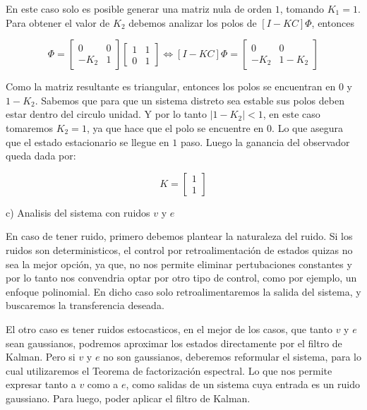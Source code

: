 En este caso solo es posible generar una matriz nula de orden $1$, tomando $K_1=1$. 
Para obtener el valor de $K_2$ debemos analizar los polos de $[I-KC]\Phi$, entonces 

\begin{equation}
    [I-KC]\Phi = 
    \begin{bmatrix}
        0 & 0 \\ 
        -K_2 & 1
    \end{bmatrix}
    \begin{bmatrix}
        1 & 1 \\ 
        0 & 1
    \end{bmatrix} \Leftrightarrow
    [I-KC]\Phi = 
    \begin{bmatrix}
        0 & 0 \\ 
        -K_2 & 1-K_2
    \end{bmatrix}
\end{equation}

Como la matriz resultante es triangular, entonces los polos se encuentran en $0$ y $1-K_2$. 
Sabemos que para que un sistema distreto sea estable sus polos deben estar dentro del circulo unidad. 
Y por lo tanto $|1-K_2|<1$, en este caso tomaremos $K_2=1$, ya que hace que el polo se encuentre en $0$. 
Lo que asegura que el estado estacionario se llegue en $1$ paso. Luego la ganancia del observador queda dada por: 

\begin{equation}
    K = \begin{bmatrix}
        1 \\ 1
    \end{bmatrix}
\end{equation}

c) Analisis del sistema con ruidos $v$ y $e$

En caso de tener ruido, primero debemos plantear la naturaleza del ruido. 
Si los ruidos son deterministicos, el control por retroalimentación de estados 
quizas no sea la mejor opción, ya que, no nos permite eliminar pertubaciones constantes 
y por lo tanto nos convendria optar por otro tipo de control, como por ejemplo, un 
enfoque polinomial. En dicho caso solo retroalimentaremos la salida del sistema, y 
buscaremos la transferencia deseada.

El otro caso es tener ruidos estocasticos, en el mejor de los casos, que 
tanto $v$ y $e$ sean gaussianos, podremos aproximar los estados directamente por el filtro de Kalman. 
Pero si $v$ y $e$ no son gaussianos, deberemos reformular el sistema, para lo cual utilizaremos el 
Teorema de factorización espectral. Lo que nos permite expresar tanto a $v$ como a $e$, 
como salidas de un sistema cuya entrada es un ruido gaussiano. Para luego, poder aplicar el 
filtro de Kalman.

